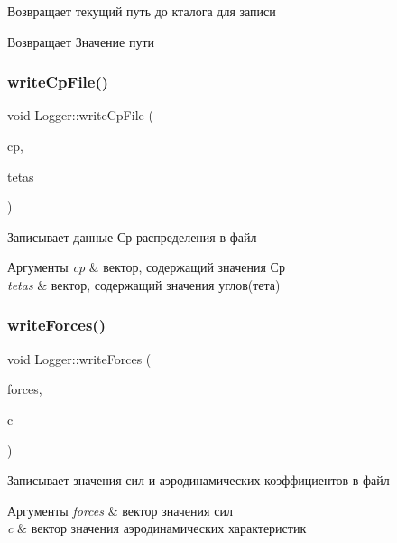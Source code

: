 Возвращает текущий путь до кталога для записи \begin{DoxyReturn}{Возвращает}
Значение пути 
\end{DoxyReturn}
\mbox{\label{class_logger_a2a424d495516f85843b0a717f14c5ec5}} 
\subsubsection{\texorpdfstring{write\+Cp\+File()}{writeCpFile()}}
{\footnotesize\ttfamily void Logger\+::write\+Cp\+File (\begin{DoxyParamCaption}\item[{const Q\+Vector$<$ double $>$}]{cp,  }\item[{const Q\+Vector$<$ double $>$}]{tetas }\end{DoxyParamCaption})}

Записывает данные Ср-\/распределения в файл 
\begin{DoxyParams}{Аргументы}
{\em cp} & вектор, содержащий значения Ср \\
\hline
{\em tetas} & вектор, содержащий значения углов(тета) \\
\hline
\end{DoxyParams}
\mbox{\label{class_logger_a6e836ef03997d4e13cc8a7f286f74561}} 
\subsubsection{\texorpdfstring{write\+Forces()}{writeForces()}}
{\footnotesize\ttfamily void Logger\+::write\+Forces (\begin{DoxyParamCaption}\item[{const \mbox{\hyperlink{class_vector3_d}{Vector3D}}}]{forces,  }\item[{const \mbox{\hyperlink{class_vector3_d}{Vector3D}}}]{c }\end{DoxyParamCaption})}

Записывает значения сил и аэродинамических коэффициентов в файл 
\begin{DoxyParams}{Аргументы}
{\em forces} & вектор значения сил \\
\hline
{\em c} & вектор значения аэродинамических характеристик \\
\hline
\end{DoxyParams}
\mbox{\label{class_logger_aa74c810654de96491af58a61f10f0a52}} 
